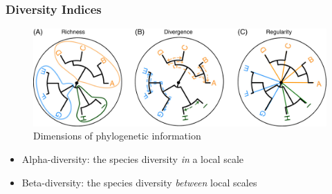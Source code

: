 \documentclass{beamer}
\begin{document}
    \begin{frame}
        \frametitle{Diversity Indices}

        \begin{figure}
            \includegraphics[width=0.8 \linewidth]{figures/phylogenic.jpg}
            \caption{Dimensions of phylogenetic information \protect\cite{phylogenetic1}}
        \end{figure}

        \begin{itemize}
            \item Alpha-diversity: the species diversity \textit{in} a local scale
            \item Beta-diversity: the species diversity \textit{between} local scales
        \end{itemize}
    \end{frame}
\end{document}
